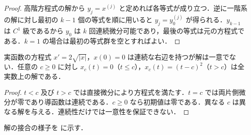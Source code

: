 \begin{proof}
高階方程式の解から $y_j=x^{(j)}$ と定めれば各等式が成り立つ．逆に一階系の解に対し最初の $k-1$ 個の等式を順に用いると $y_j=y_0^{(j)}$ が得られる．$y_{k-1}$ は $C^1$ 級であるから $y_0$ は $k$ 回連続微分可能であり，最後の等式は元の方程式である．$k=1$ の場合は最初の等式群を空とすればよい．
\end{proof}
\begin{example}[定数解と非一意な初期値問題]
実函数の方程式 $x'=2\sqrt{|x|}$，$x(0)=0$ は連続な右辺を持つが解は一意でない．任意の $c\geq0$ に対し $x_c(t)=0$（$t\leq c$），$x_c(t)=(t-c)^2$（$t>c$）は全実数上の解である．
\end{example}
\begin{proof}
$t<c$ 及び $t>c$ では直接微分により方程式を満たす．$t=c$ では両片側微分が零であり導函数は連続である．$c\geq0$ なら初期値は零である．異なる $c$ は異なる解を与える．連続性だけでは一意性を保証できない．
\end{proof}
解の接合の様子を  に示す．
